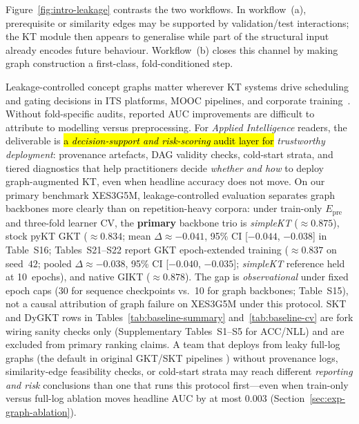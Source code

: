\documentclass[pdflatex,sn-mathphys-num]{sn-jnl}
\newcommand{\Epre}{\ensuremath{E_{\text{pre}}}}
\newcommand{\GKTdeltaci}{[$-0.044$, $-0.038$]}
\newcommand{\GKTthirtydeltavec}{-0.038}
\newcommand{\GKTthirtydeltaci}{[$-0.040$, $-0.035$]}
\newcommand{\rev}[1]{\hl{#1}}
\newcommand{\rev}[1]{#1}
\begin{document}
Figure~\ref{fig:intro-leakage} contrasts the two workflows. In
workflow~(a), prerequisite or similarity edges may be supported by
validation/test interactions; the KT module then appears to generalise
while part of the structural input already encodes future behaviour.
Workflow~(b) closes this channel by making graph construction a
first-class, fold-conditioned step.

Leakage-controlled concept graphs matter wherever KT systems drive
scheduling and gating decisions in ITS platforms, MOOC pipelines, and
corporate training~\cite{heffernan2006assist,junyi_dataset,choi2020ednet,xes3g5m2023}.
Without fold-specific audits, reported AUC improvements are difficult to
attribute to modelling versus preprocessing. For \textit{Applied
Intelligence} readers, the deliverable is \rev{a \emph{decision-support and
risk-scoring} audit layer for} \emph{trustworthy deployment}: provenance
artefacts, DAG validity checks, cold-start strata, and tiered diagnostics that
help practitioners decide \emph{whether and how} to deploy graph-augmented KT,
even when headline accuracy does not move. On our primary benchmark XES3G5M, leakage-controlled
evaluation separates graph backbones more clearly than on repetition-heavy
corpora: under train-only $\Epre$ and three-fold learner CV, the
\textbf{primary} backbone trio is \textit{simpleKT} (${\approx}0.875$),
stock pyKT GKT (${\approx}0.834$; mean $\Delta{\approx}{-}0.041$, 95\% CI
\GKTdeltaci{} in Table~S16; Tables~S21--S22 report GKT epoch-extended training
(${\approx}0.837$ on seed~$42$; pooled $\Delta{\approx}\GKTthirtydeltavec{}$,
95\% CI \GKTthirtydeltaci{}; \textit{simpleKT} reference held at 10~epochs),
and native GIKT (${\approx}0.878$). The gap is
\emph{observational} under fixed epoch caps (30 for sequence checkpoints
vs.\ 10 for graph backbones; Table~S15), not a causal attribution of graph
failure on XES3G5M under this protocol. SKT and DyGKT rows in
Tables~\ref{tab:baseline-summary} and~\ref{tab:baseline-cv} are fork wiring
sanity checks only (Supplementary Tables~S1--S5 for ACC/NLL) and are excluded
from primary ranking claims. A team that
deploys from leaky full-log graphs (the default in original GKT/SKT pipelines
\cite{nakagawa2019gkt,tong2020skt}) without provenance logs, similarity-edge
feasibility checks, or cold-start strata may reach different \emph{reporting
and risk} conclusions than one that runs this protocol first---even when
train-only versus full-log ablation moves headline AUC by at most $0.003$
(Section~\ref{sec:exp-graph-ablation}).
\end{document}
